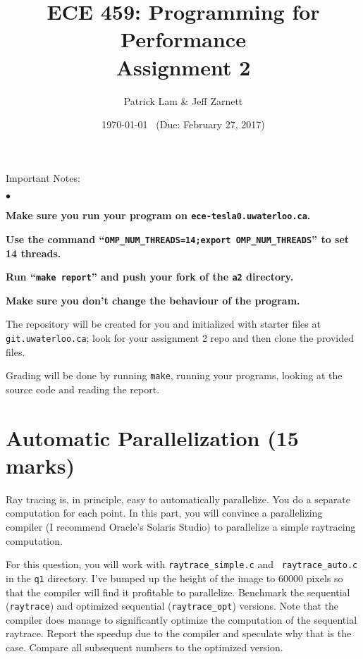 \documentclass[letterpaper,10pt]{article}
\title{\bf ECE 459: Programming for Performance\\Assignment 2}
\author{Patrick Lam \& Jeff Zarnett}
\date{\today ~ (Due: February 27, 2017)}
\begin{document}
\maketitle
\newcommand{\squishlist}{
 \begin{list}{$\bullet$}
  { \setlength{\itemsep}{0pt}
     \setlength{\parsep}{3pt}
     \setlength{\topsep}{3pt}
     \setlength{\partopsep}{0pt}
     \setlength{\leftmargin}{1.5em}
     \setlength{\labelwidth}{1em}
     \setlength{\labelsep}{0.5em} } }
\newcommand{\squishend}{
  \end{list}  }

\noindent
Important Notes:

\squishlist
  \item {\bf Make sure you run your program on {\tt ece-tesla0.uwaterloo.ca}.}
  \item {\bf Use the command ``{\tt OMP\_NUM\_THREADS=14;export OMP\_NUM\_THREADS}'' to set 14 threads.}
  \item {\bf Run ``{\tt make report}'' and push your fork of the {\tt a2} directory.}
  \item {\bf Make sure you don't change the behaviour of the program.}
\squishend

\noindent
The repository will be created for you and initialized with starter files 
at \texttt{git.uwaterloo.ca}; look for your 
assignment 2 repo and then clone the provided files.

Grading will be done by running {\tt make}, running your programs,
looking at the source code and reading the report.

\section{Automatic Parallelization (15 marks)}
Ray tracing is, in principle, easy to automatically parallelize. You do
a separate computation for each point. In this part, you will convince a
parallelizing compiler (I recommend Oracle's Solaris Studio) to parallelize
a simple raytracing computation.

For this question, you will work with {\tt raytrace\_simple.c} and {\tt
  raytrace\_auto.c} in the {\tt q1} directory.  I've bumped up the
height of the image to 60000 pixels so that the compiler will find it
profitable to parallelize. Benchmark the sequential ({\tt raytrace})
and optimized sequential ({\tt raytrace\_opt}) versions. Note that the
compiler does manage to significantly optimize the computation of the sequential
raytrace. Report the speedup due to the compiler and
speculate why that is the case. Compare all subsequent numbers
to the optimized version.
\end{document}
